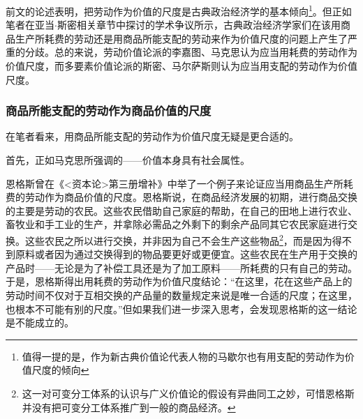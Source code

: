 前文的论述表明，把劳动作为价值的尺度是古典政治经济学的基本倾向\footnote{值得一提的是，作为新古典价值论代表人物的马歇尔也有用支配的劳动作为价值尺度的倾向\cite{perskyMarshallsNeoClassicalLaborValues1999}}。但正如笔者在亚当$\cdot$斯密相关章节中探讨的学术争议所示，古典政治经济学家们在该用商品生产所耗费的劳动还是用商品所能支配的劳动来作为价值尺度的问题上产生了严重的分歧。总的来说，劳动价值论派的李嘉图、马克思认为应当用耗费的劳动作为价值尺度，而多要素价值论派的斯密、马尔萨斯则认为应当用支配的劳动作为价值尺度。

\subsubsection{商品所能支配的劳动作为商品价值的尺度}

在笔者看来，用商品所能支配的劳动作为价值尺度无疑是更合适的。

首先，正如马克思所强调的——价值本身具有社会属性\cite[61]{ZhongGongZhongYangMaKeSiEnGeSiLieNingSiDaLinZhuZuoBianYiJuMaKeSiEnGeSiWenJiDi5Juan2009}。

恩格斯曾在《<资本论>第三册增补》中举了一个例子来论证应当用商品生产所耗费的劳动作为商品价值的尺度\cite[1015-1018]{ZhongGongZhongYangMaKeSiEnGeSiLieNingSiDaLinZhuZuoBianYiJuMaKeSiEnGeSiWenJiDi7Juan2009}。恩格斯说，在商品经济发展的初期，进行商品交换的主要是劳动的农民。这些农民借助自己家庭的帮助，在自己的田地上进行农业、畜牧业和手工业的生产，并拿除必需品之外剩下的剩余产品同其它农民家庭进行交换。这些农民之所以进行交换，并非因为自己不会生产这些物品\footnote{这一对可变分工体系的认识与广义价值论的假设有异曲同工之妙，可惜恩格斯并没有把可变分工体系推广到一般的商品经济。}，而是因为得不到原料或者因为通过交换得到的物品要更好或更便宜。这些农民在生产用于交换的产品时——无论是为了补偿工具还是为了加工原料——所耗费的只有自己的劳动。于是，恩格斯得出用耗费的劳动作为价值尺度结论：“在这里，花在这些产品上的劳动时间不仅对于互相交换的产品量的数量规定来说是唯一合适的尺度；在这里，也根本不可能有别的尺度。”\cite[1016]{ZhongGongZhongYangMaKeSiEnGeSiLieNingSiDaLinZhuZuoBianYiJuMaKeSiEnGeSiWenJiDi7Juan2009}但如果我们进一步深入思考，会发现恩格斯的这一结论是不能成立的。

